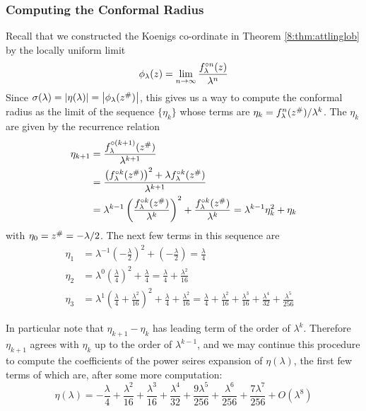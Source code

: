 \documentclass[../main.tex]{subfiles}
\begin{document}
\subsubsection{Computing the Conformal Radius}

Recall that we constructed the Koenigs co-ordinate in Theorem \ref{8:thm:attlinglob} by the locally uniform limit
\[
\phi_\lambda(z) = \lim_{n\to\infty}\frac{f_\lambda^{\circ n}(z)}{\lambda^n}
\]
Since $\sigma(\lambda) = \left|\eta(\lambda)\right| = \left|\phi_\lambda(z^{\#})\right|$, this gives us a way to compute the conformal radius as the limit of the sequence $\{\eta_k\}$ whose terms are $\eta_k = f_\lambda^n(z^{\#})/\lambda^k$. The $\eta_k$ are given by the recurrence relation
\begin{align*}
\eta_{k+1} &= \frac{f_\lambda^{\circ(k+1)}(z^{\#})}{\lambda^{k+1}}\\
&= \frac{\left(f_\lambda^{\circ k}(z^{\#})\right)^2 + \lambda f_\lambda^{\circ k}(z^{\#})}{\lambda^{k+1}}\\
&= \lambda^{k-1}\left(\frac{f_\lambda^{\circ k}(z^{\#})}{\lambda^k}\right)^2 + \frac{f_\lambda^{\circ k}(z^{\#})}{\lambda^k}
= \lambda^{k-1}\eta_k^2 + \eta_k
\end{align*}
with $\eta_0 = z^{\#} = -\lambda/2$. The next few terms in this sequence are
\begin{align*}
    \eta_1 &= \lambda^{-1} \left(-\frac{\lambda}{2}\right)^2 + \left(-\frac{\lambda}{2}\right)
    = \frac{\lambda}{4}&\\
    \eta_2 &= \lambda^0 \left(\frac{\lambda}{4}\right)^2 + \frac{\lambda}{4}
    = \frac{\lambda}{4} + \frac{\lambda^2}{16}&\\
    \eta_3 &= \lambda^1\left(\frac{\lambda}{4} + \frac{\lambda^2}{16}\right)^2 + \frac{\lambda}{4} + \frac{\lambda^2}{16}
    = \frac{\lambda}{4} +\frac{\lambda^2}{16} + \frac{\lambda^3}{16} + \frac{\lambda^4}{32} + \frac{\lambda^5}{256}
\end{align*}

In particular note that $\eta_{k+1} - \eta_k$ has leading term of the order of $\lambda^k$. Therefore $\eta_{k+1}$ agrees with $\eta_k$ up to the order of $\lambda^{k-1}$, and we may continue this procedure to compute the coefficients of the power seires expansion of $\eta(\lambda)$, the first few terms of which are, after some more computation:
\[
\eta(\lambda) = -\frac{\lambda}{4} + \frac{\lambda^2}{16}
+\frac{\lambda^3}{16} + \frac{\lambda^4}{32} + \frac{9\lambda^5}{256} + \frac{\lambda^6}{256} +
\frac{7\lambda^7}{256} + O(\lambda^8)
\]
\end{document}
